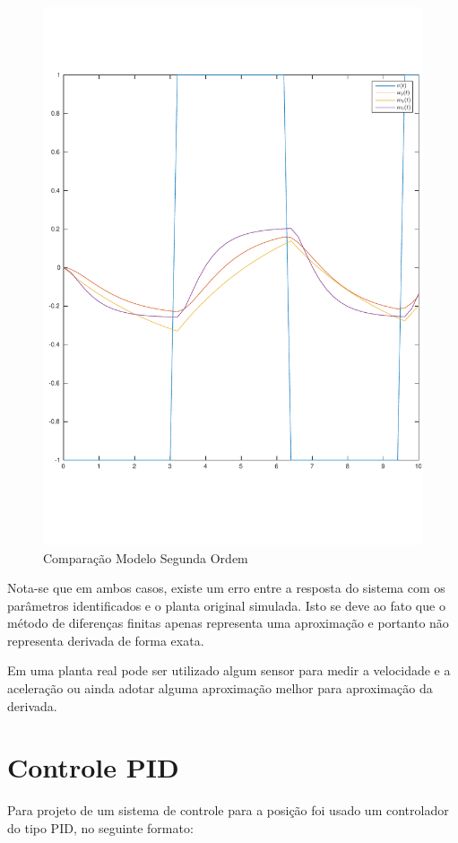 \documentclass[a4paper,11pt]{article}
\begin{document}
\begin{figure}[H]
    \centering
    \includegraphics[width=0.6\linewidth]{tex/img/model2Evaluation.pdf}
    \caption{Comparação Modelo Segunda Ordem}
    \label{fig:model2Evaluation}
\end{figure}

Nota-se que em ambos casos, existe um erro entre a resposta do sistema com os parâmetros identificados e o planta original simulada. Isto se deve ao fato que o método de diferenças finitas apenas representa uma aproximação e portanto não representa derivada de forma exata.

Em uma planta real pode ser utilizado algum sensor para medir a velocidade e a aceleração ou ainda adotar alguma aproximação melhor para aproximação da derivada.






\section{Controle PID}


Para projeto de um sistema de controle para a posição foi usado um controlador do tipo PID, no seguinte formato:
\end{document}
